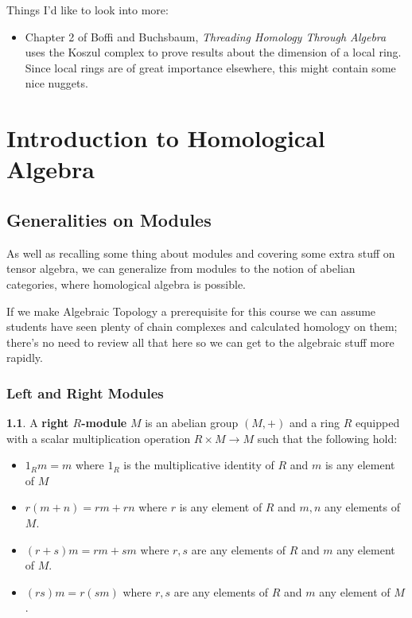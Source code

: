 \documentclass[oneside,english]{amsbook}
\numberwithin{section}{chapter}
\theoremstyle{plain}
\theoremstyle{definition}
\newtheorem{defn}[thm]{\protect\definitionname}
\providecommand{\definitionname}{Definition}
\begin{document}
		Things I'd like to look into more:
		\begin{itemize}
			\item Chapter 2 of Boffi and Buchsbaum, \textit{Threading Homology Through Algebra} uses the Koszul complex to prove results about the dimension of a local ring. Since local rings are of great importance elsewhere, this might contain some nice nuggets.
		\end{itemize}

	\part{Introduction to Homological Algebra}
	
	\chapter{Generalities on Modules}
	
	As well as recalling some thing about modules and covering some extra stuff on tensor algebra, we can generalize from modules to the notion of abelian categories, where homological algebra is possible.
	
	If we make Algebraic Topology a prerequisite for this course we can assume students have seen plenty of chain complexes and calculated homology on them; there's no need to review all that here so we can get to the algebraic stuff more rapidly.
	
	\section{Left and Right Modules}
	
		\begin{defn}
			A \textbf{right $R$-module} $M$ is an abelian group $(M, +)$ and a ring $R$ equipped with a scalar multiplication operation $R\times M\to M$ such that the following hold:
			\begin{itemize}
				\item $1_Rm = m$ where $1_R$ is the multiplicative identity of $R$ and $m$ is any element of $M$
				\item $r(m + n) = rm + rn$ where $r$ is any element of $R$ and $m, n$ any elements of $M$.
				\item $(r + s)m = rm + sm$ where $r, s$ are any elements of $R$ and $m$ any element of $M$.
				\item $(rs)m = r(sm)$ where $r, s$ are any elements of $R$ and $m$ any element of $M$.
			\end{itemize}
		\end{defn}
	
\end{document}
